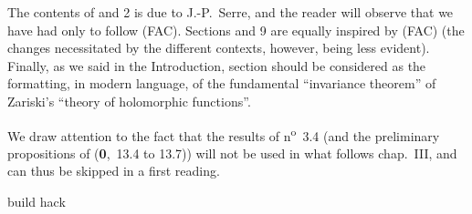 The contents of \textsection{} and 2 is due to J.-P.~Serre, and the reader will observe that we have had only to follow (FAC).
Sections  and 9 are equally inspired by (FAC) (the changes necessitated by the different contexts, however, being less evident).
Finally, as we said in the Introduction, section  should be considered as the formatting, in modern language, of the fundamental ``invariance theorem'' of Zariski's ``theory of holomorphic functions''.

We draw attention to the fact that the results of n\textsuperscript{o}~3.4 (and the preliminary propositions of (\textbf{0},~13.4 to 13.7)) will not be used in what follows chap.~III, and can thus be skipped in a first reading.

\bigskip









build hack
\cite{I-1}







